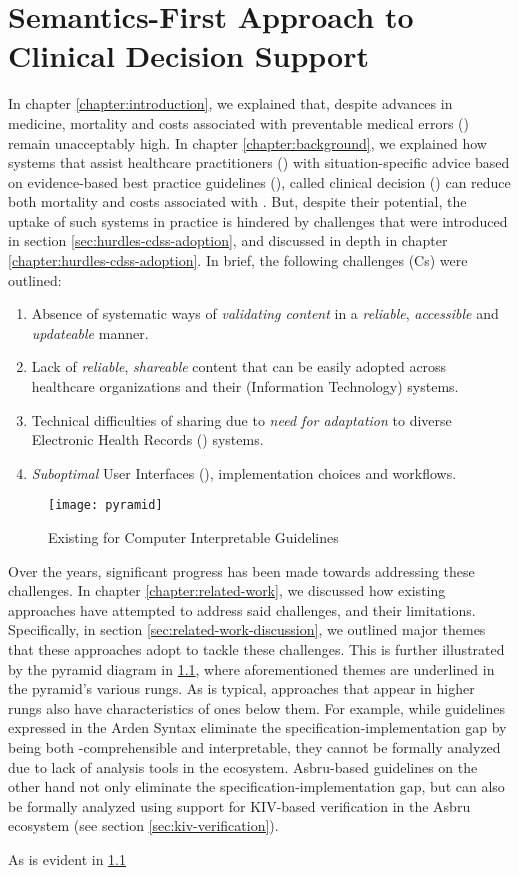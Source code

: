 \chapter{Semantics-First Approach to Clinical Decision Support}

In chapter \ref{chapter:introduction}, we explained that, despite
advances in medicine, mortality and costs associated with preventable
medical errors (\PMEs{}) remain unacceptably high. In chapter
\ref{chapter:background}, we explained how systems that
assist healthcare practitioners (\HCPs{}) with situation-specific
advice based on evidence-based best practice guidelines (\BPGs{}),
called clinical decision (\CDSSs{}) can reduce both mortality
and costs associated with \PMEs{}. But, despite their potential,
the uptake of such systems in practice is hindered by challenges
that were introduced in section \ref{sec:hurdles-cdss-adoption}, and
discussed in depth in chapter \ref{chapter:hurdles-cdss-adoption}.
In brief, the following challenges (Cs) were outlined:
\begin{enumerate}[label=C\arabic*.]
\itemsep0.0em
\item Absence of systematic ways of \emph{validating content}
in a \emph{reliable}, \emph{accessible} and \emph{updateable} manner.
\item Lack of \emph{reliable}, \emph{shareable} \CDSS{} content
that can be easily adopted across healthcare organizations and their (Information
Technology) \IT{} systems.
\item Technical difficulties of sharing due to \emph{need for
  adaptation} to diverse Electronic Health Records (\EHR) systems.
\item \emph{Suboptimal} User Interfaces (\UIs), implementation choices and
workflows.
\end{enumerate}

\begin{figure}[bh]
  \centering
  \texttt{[image: pyramid]}
  \caption{Existing \DSLs{} for Computer Interpretable Guidelines}\label{fig:existing-work-pyramid}
\end{figure}

Over the years, significant progress has been made towards
addressing these challenges. In chapter \ref{chapter:related-work},
we discussed how existing approaches have attempted to
address said challenges, and their limitations. Specifically,
in section \ref{sec:related-work-discussion}, we outlined major
themes that these approaches adopt to tackle these challenges.
This is further illustrated by the pyramid diagram in \figurename{}
\ref{fig:existing-work-pyramid}, where aforementioned themes are
underlined in the pyramid's various rungs.
As is typical, approaches that appear in higher rungs also
have characteristics of ones below them. For example, while guidelines expressed in
the Arden Syntax eliminate the specification-implementation gap by being
both \HCP{}-comprehensible and interpretable, they cannot be formally analyzed
due to lack of analysis tools in the ecosystem. Asbru-based guidelines
on the other hand not only eliminate the specification-implementation gap, but can also be
formally analyzed using support for KIV-based verification in the Asbru
ecosystem (see section \ref{sec:kiv-verification}).

As is evident in \figurename{} \ref{fig:existing-work-pyramid}



